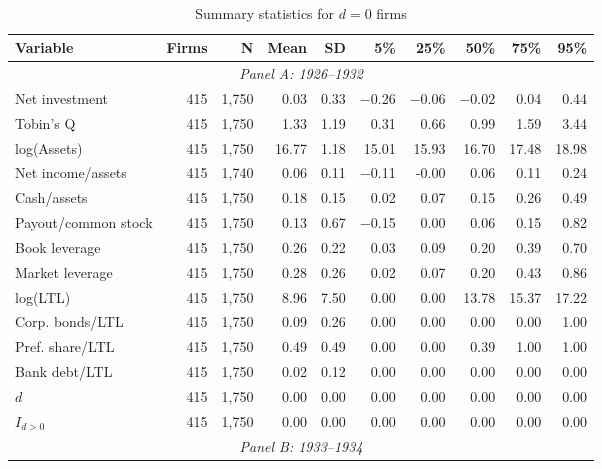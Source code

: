 \begin{table}[p]\centering
    \caption{\\ Summary statistics for $d = 0$ firms}\scriptsize
    \label{tabapp:summary_d_0}
    \begin{threeparttable}
        \begin{tabular}{lrrrrrrrrr}
            \toprule
            Variable & Firms & N & Mean & SD & 5\% & 25\% & 50\% & 75\% & 95\% \\
            \midrule
            \multicolumn{10}{c}{\textit{Panel A: 1926--1932}} \\
            \midrule
            Net investment & 415 & 1,750 & 0.03 & 0.33 & $-$0.26 & $-$0.06 & $-$0.02 & 0.04 & 0.44 \\
            Tobin's Q & 415 & 1,750 & 1.33 & 1.19 & 0.31 & 0.66 & 0.99 & 1.59 & 3.44 \\
            log(Assets) & 415 & 1,750 & 16.77 & 1.18 & 15.01 & 15.93 & 16.70 & 17.48 & 18.98 \\
            Net income/assets & 415 & 1,740 & 0.06 & 0.11 & $-$0.11 & -0.00 & 0.06 & 0.11 & 0.24 \\
            Cash/assets & 415 & 1,750 & 0.18 & 0.15 & 0.02 & 0.07 & 0.15 & 0.26 & 0.49 \\
            Payout/common stock & 415 & 1,750 & 0.13 & 0.67 & $-$0.15 & 0.00 & 0.06 & 0.15 & 0.82 \\
            Book leverage & 415 & 1,750 & 0.26 & 0.22 & 0.03 & 0.09 & 0.20 & 0.39 & 0.70 \\
            Market leverage & 415 & 1,750 & 0.28 & 0.26 & 0.02 & 0.07 & 0.20 & 0.43 & 0.86 \\
            log(LTL) & 415 & 1,750 & 8.96 & 7.50 & 0.00 & 0.00 & 13.78 & 15.37 & 17.22 \\
            Corp. bonds/LTL & 415 & 1,750 & 0.09 & 0.26 & 0.00 & 0.00 & 0.00 & 0.00 & 1.00 \\
            Pref. share/LTL & 415 & 1,750 & 0.49 & 0.49 & 0.00 & 0.00 & 0.39 & 1.00 & 1.00 \\
            Bank debt/LTL & 415 & 1,750 & 0.02 & 0.12 & 0.00 & 0.00 & 0.00 & 0.00 & 0.00 \\
            \ensuremath{d} & 415 & 1,750 & 0.00 & 0.00 & 0.00 & 0.00 & 0.00 & 0.00 & 0.00 \\
            \ensuremath{I_{d>0}} & 415 & 1,750 & 0.00 & 0.00 & 0.00 & 0.00 & 0.00 & 0.00 & 0.00 \\
            \midrule
            \multicolumn{10}{c}{\textit{Panel B: 1933--1934}} \\

\end{tabular}
\end{threeparttable}
\end{table}
